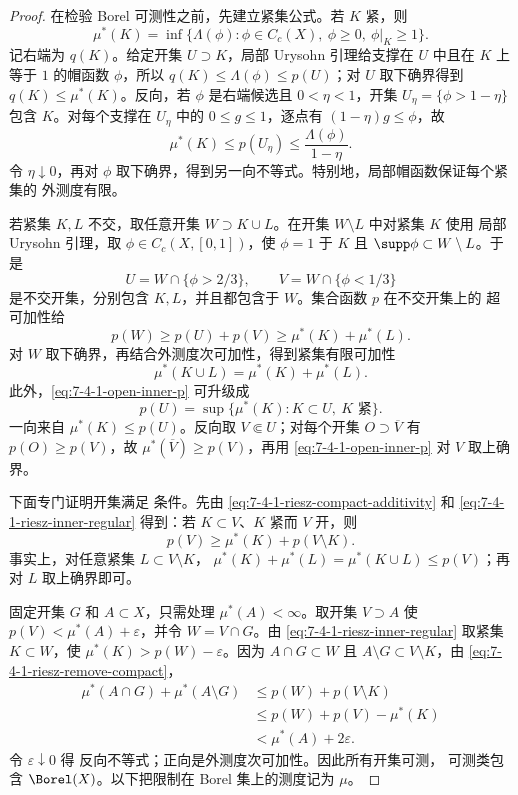 \begin{proof}
在检验 Borel 可测性之前，先建立紧集公式。若 $K$ 紧，则
\begin{equation}\label{eq:7-4-1-riesz-compact-majorant}
 \mu^*(K)=\inf\{\Lambda(\phi):
 \phi\in C_c(X),\ \phi\ge0,\ \phi|_K\ge1\}.
\end{equation}
记右端为 $q(K)$。给定开集 $U\supset K$，局部 Urysohn 引理给支撑在 $U$ 中且在 $K$ 上等于 $1$
的帽函数 $\phi$，所以 $q(K)\le\Lambda(\phi)\le p(U)$；对 $U$ 取下确界得到
$q(K)\le\mu^*(K)$。反向，若 $\phi$ 是右端候选且 $0<\eta<1$，开集
$U_\eta=\{\phi>1-\eta\}$ 包含 $K$。对每个支撑在 $U_\eta$ 中的 $0\le g\le1$，逐点有
$(1-\eta)g\le\phi$，故
\[
 \mu^*(K)\le p(U_\eta)\le\frac{\Lambda(\phi)}{1-\eta}.
\]
令 $\eta\downarrow0$，再对 $\phi$ 取下确界，得到另一向不等式。特别地，局部帽函数保证每个紧集的
外测度有限。

若紧集 $K,L$ 不交，取任意开集 $W\supset K\cup L$。在开集 $W\setminus L$ 中对紧集 $K$ 使用
局部 Urysohn 引理，取 $\phi\in C_c(X,[0,1])$，使 $\phi=1$ 于 $K$ 且
$\supp\phi\subset W\setminus L$。于是
\[
 U=W\cap\{\phi>2/3\},\qquad V=W\cap\{\phi<1/3\}
\]
是不交开集，分别包含 $K,L$，并且都包含于 $W$。集合函数 $p$ 在不交开集上的
超可加性给
\[
 p(W)\ge p(U)+p(V)\ge\mu^*(K)+\mu^*(L).
\]
对 $W$ 取下确界，再结合外测度次可加性，得到紧集有限可加性
\begin{equation}\label{eq:7-4-1-riesz-compact-additivity}
 \mu^*(K\cup L)=\mu^*(K)+\mu^*(L).
\end{equation}
此外，\eqref{eq:7-4-1-open-inner-p} 可升级成
\begin{equation}\label{eq:7-4-1-riesz-inner-regular}
 p(U)=\sup\{\mu^*(K):K\subset U,\ K\text{ 紧}\}.
\end{equation}
一向来自 $\mu^*(K)\le p(U)$。反向取 $V\Subset U$；对每个开集 $O\supset\overline V$ 有
$p(O)\ge p(V)$，故 $\mu^*(\overline V)\ge p(V)$，再用
\eqref{eq:7-4-1-open-inner-p} 对 $V$ 取上确界。

下面专门证明开集满足 \Caratheodory{} 条件。先由
\eqref{eq:7-4-1-riesz-compact-additivity} 和
\eqref{eq:7-4-1-riesz-inner-regular} 得到：若 $K\subset V$、$K$ 紧而 $V$ 开，则
\begin{equation}\label{eq:7-4-1-riesz-remove-compact}
 p(V)\ge\mu^*(K)+p(V\setminus K).
\end{equation}
事实上，对任意紧集 $L\subset V\setminus K$，
$\mu^*(K)+\mu^*(L)=\mu^*(K\cup L)\le p(V)$；再对 $L$ 取上确界即可。

固定开集 $G$ 和 $A\subset X$，只需处理 $\mu^*(A)<\infty$。取开集 $V\supset A$ 使
$p(V)<\mu^*(A)+\varepsilon$，并令 $W=V\cap G$。由
\eqref{eq:7-4-1-riesz-inner-regular} 取紧集 $K\subset W$，使
$\mu^*(K)>p(W)-\varepsilon$。因为 $A\cap G\subset W$ 且
$A\setminus G\subset V\setminus K$，由 \eqref{eq:7-4-1-riesz-remove-compact}，
\begin{align*}
 \mu^*(A\cap G)+\mu^*(A\setminus G)
 &\le p(W)+p(V\setminus K)\\
 &\le p(W)+p(V)-\mu^*(K)\\
 &<\mu^*(A)+2\varepsilon.
\end{align*}
令 $\varepsilon\downarrow0$ 得 \Caratheodory{} 反向不等式；正向是外测度次可加性。因此所有开集可测，
\Caratheodory{} 可测类包含 $\Borel(X)$。以下把限制在 Borel 集上的测度记为 $\mu$。


\end{proof}
